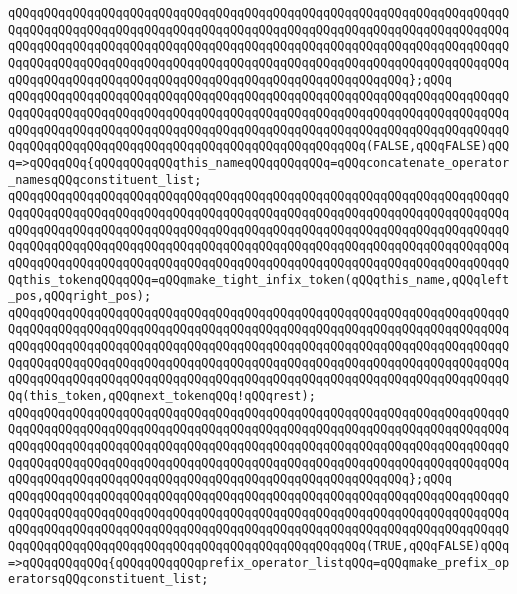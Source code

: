 \verb|qQQqqQQqqQQqqQQqqQQqqQQqqQQqqQQqqQQqqQQqqQQqqQQqqQQqqQQqqQQqqQQqqQQqqQQqqQQqqQQqqQQqqQQqqQQqqQQqqQQqqQQqqQQqqQQqqQQqqQQqqQQqqQQqqQQqqQQqqQQqqQQqqQQqqQQqqQQqqQQqqQQqqQQqqQQqqQQqqQQqqQQqqQQqqQQqqQQqqQQqqQQqqQQqqQQqqQQqqQQqqQQqqQQqqQQqqQQqqQQqqQQqqQQqqQQqqQQqqQQqqQQqqQQqqQQqqQQqqQQqqQQqqQQqqQQqqQQqqQQqqQQqqQQqqQQqqQQqqQQqqQQqqQQqqQQqqQQq};qQQq|\newline
\newline
\verb|qQQqqQQqqQQqqQQqqQQqqQQqqQQqqQQqqQQqqQQqqQQqqQQqqQQqqQQqqQQqqQQqqQQqqQQqqQQqqQQqqQQqqQQqqQQqqQQqqQQqqQQqqQQqqQQqqQQqqQQqqQQqqQQqqQQqqQQqqQQqqQQqqQQqqQQqqQQqqQQqqQQqqQQqqQQqqQQqqQQqqQQqqQQqqQQqqQQqqQQqqQQqqQQqqQQqqQQqqQQqqQQqqQQqqQQqqQQqqQQqqQQqqQQqqQQqqQQqqQQq(FALSE,qQQqFALSE)qQQq=>qQQqqQQq{qQQqqQQqqQQqthis_nameqQQqqQQqqQQq=qQQqconcatenate_operator_namesqQQqconstituent_list;|\newline
\verb|qQQqqQQqqQQqqQQqqQQqqQQqqQQqqQQqqQQqqQQqqQQqqQQqqQQqqQQqqQQqqQQqqQQqqQQqqQQqqQQqqQQqqQQqqQQqqQQqqQQqqQQqqQQqqQQqqQQqqQQqqQQqqQQqqQQqqQQqqQQqqQQqqQQqqQQqqQQqqQQqqQQqqQQqqQQqqQQqqQQqqQQqqQQqqQQqqQQqqQQqqQQqqQQqqQQqqQQqqQQqqQQqqQQqqQQqqQQqqQQqqQQqqQQqqQQqqQQqqQQqqQQqqQQqqQQqqQQqqQQqqQQqqQQqqQQqqQQqqQQqqQQqqQQqqQQqqQQqqQQqqQQqqQQqqQQqqQQqqQQqqQQqqQQqqQQqthis_tokenqQQqqQQq=qQQqmake_tight_infix_token(qQQqthis_name,qQQqleft_pos,qQQqright_pos);|\newline
\newline
\verb|qQQqqQQqqQQqqQQqqQQqqQQqqQQqqQQqqQQqqQQqqQQqqQQqqQQqqQQqqQQqqQQqqQQqqQQqqQQqqQQqqQQqqQQqqQQqqQQqqQQqqQQqqQQqqQQqqQQqqQQqqQQqqQQqqQQqqQQqqQQqqQQqqQQqqQQqqQQqqQQqqQQqqQQqqQQqqQQqqQQqqQQqqQQqqQQqqQQqqQQqqQQqqQQqqQQqqQQqqQQqqQQqqQQqqQQqqQQqqQQqqQQqqQQqqQQqqQQqqQQqqQQqqQQqqQQqqQQqqQQqqQQqqQQqqQQqqQQqqQQqqQQqqQQqqQQqqQQqqQQqqQQqqQQqqQQqqQQqqQQqqQQqqQQqqQQq(this_token,qQQqnext_tokenqQQq!qQQqrest);|\newline
\verb|qQQqqQQqqQQqqQQqqQQqqQQqqQQqqQQqqQQqqQQqqQQqqQQqqQQqqQQqqQQqqQQqqQQqqQQqqQQqqQQqqQQqqQQqqQQqqQQqqQQqqQQqqQQqqQQqqQQqqQQqqQQqqQQqqQQqqQQqqQQqqQQqqQQqqQQqqQQqqQQqqQQqqQQqqQQqqQQqqQQqqQQqqQQqqQQqqQQqqQQqqQQqqQQqqQQqqQQqqQQqqQQqqQQqqQQqqQQqqQQqqQQqqQQqqQQqqQQqqQQqqQQqqQQqqQQqqQQqqQQqqQQqqQQqqQQqqQQqqQQqqQQqqQQqqQQqqQQqqQQqqQQqqQQqqQQqqQQq};qQQq|\newline
\newline
\verb|qQQqqQQqqQQqqQQqqQQqqQQqqQQqqQQqqQQqqQQqqQQqqQQqqQQqqQQqqQQqqQQqqQQqqQQqqQQqqQQqqQQqqQQqqQQqqQQqqQQqqQQqqQQqqQQqqQQqqQQqqQQqqQQqqQQqqQQqqQQqqQQqqQQqqQQqqQQqqQQqqQQqqQQqqQQqqQQqqQQqqQQqqQQqqQQqqQQqqQQqqQQqqQQqqQQqqQQqqQQqqQQqqQQqqQQqqQQqqQQqqQQqqQQqqQQqqQQqqQQq(TRUE,qQQqFALSE)qQQq=>qQQqqQQqqQQq{qQQqqQQqqQQqprefix_operator_listqQQq=qQQqmake_prefix_operatorsqQQqconstituent_list;|\newline
